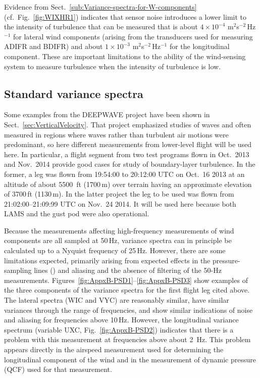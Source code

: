 \documentclass[12pt,twoside,english]{article}\usepackage[]{graphicx}\usepackage[]{color}
\let\OrgIndex\index
\renewcommand*{\index}[1]{\OrgIndex{#1}}
\begin{document}
{{Evidence from Sect.~\ref{sub:Variance-spectra-for-W-components} (cf.~Fig.~\ref{fig:WIXHR1}) indicates that sensor noise introduces a lower limit to the intensity of turbulence that can be measured that is about $4\times10^{-4}$ m$^{2}$s$^{-2}$\,Hz$^{-1}$ for lateral wind components (arising from the transducers used for measuring ADIFR and BDIFR) and about $1\times10^{-3}$ m$^{2}$s$^{-2}$\,Hz$^{-1}$ for the longitudinal component. These are important limitations to the ability of the wind-sensing system to measure turbulence when the intensity of turbulence is low. 


\subsection{Standard variance spectra\label{sub:var-spec}}

Some examples from the DEEPWAVE project have been shown in Sect.~\ref{sec:VerticalVelocity}. That project emphasized studies of waves and often measured in regions where waves rather than turbulent air motions were predominant, so here different measurements from lower-level flight will be used here. In particular, a flight segment from two test programs flown in Oct.~2013 and Nov.~2014 provide good cases for study of boundary-layer turbulence. In the former, a leg was flown from 19:54:00 to 20:12:00 UTC on Oct.~16 2013 at an altitude of about 5500~ft (1700\,m) over terrain having an approximate elevation of 3700\,ft (1130\,m). In the latter project the leg to be used was flown from 21:02:00--21:09:99 UTC on Nov.~24 2014. It will be used here because both LAMS and the gust pod were also operational. 



Because the measurements affecting high-frequency measurements of wind components are all sampled at 50\,Hz, variance spectra can in principle be calculated up to a Nyquist frequency of 25\,Hz. However, there are some limitations expected, primarily arising from expected effects in the pressure-sampling lines (\citet{Iberall1950}) and aliasing and the absence of filtering of the 50-Hz measurements. Figures\ \ref{fig:AppxB-PSD1}--\ref{fig:AppxB-PSD3} show examples of the three components of the variance spectra for the first flight leg cited above. The lateral spectra (WIC and VYC) are reasonably similar, have similar variances through the range of frequencies, and show similar indications of noise and aliasing for frequencies above 10\,Hz. However, the longitudinal variance spectrum (variable UXC, Fig.~\ref{fig:AppxB-PSD2}) indicates that there is a problem with this measurement at frequencies above about 2~Hz. This problem appears directly in the airspeed measurement used for determining the longitudinal component of the wind and in the measurement of dynamic pressure (QCF) used for that measurement. 

}}
\end{document}
